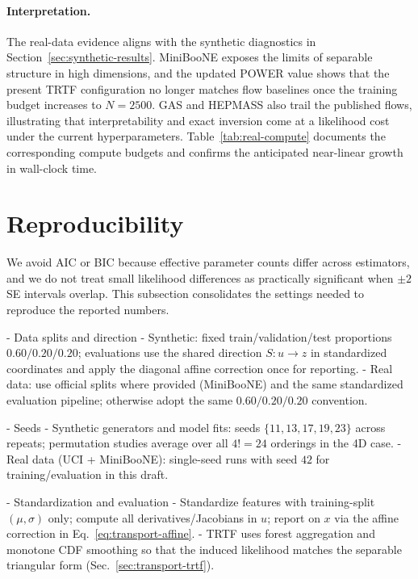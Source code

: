 \documentclass[11pt,a4paper,twoside]{book}\usepackage[]{graphicx}\usepackage[]{xcolor}
\begin{document}
\paragraph{Interpretation.} The real-data evidence aligns with the synthetic diagnostics in Section~\ref{sec:synthetic-results}. MiniBooNE exposes the limits of separable structure in high dimensions, and the updated POWER value shows that the present TRTF configuration no longer matches flow baselines once the training budget increases to $N=2500$. GAS and HEPMASS also trail the published flows, illustrating that interpretability and exact inversion come at a likelihood cost under the current hyperparameters. Table~\ref{tab:real-compute} documents the corresponding compute budgets and confirms the anticipated near-linear growth in wall-clock time.

\section{Reproducibility}\label{sec:reproducibility}
We avoid AIC or BIC because effective parameter counts differ across estimators, and we do not treat small likelihood differences as practically significant when $\pm 2$ SE intervals overlap. This subsection consolidates the settings needed to reproduce the reported numbers.

- Data splits and direction
  - Synthetic: fixed train/validation/test proportions $0.60/0.20/0.20$; evaluations use the shared direction $S:u\to z$ in standardized coordinates and apply the diagonal affine correction once for reporting.
  - Real data: use official splits where provided (MiniBooNE) and the same standardized evaluation pipeline; otherwise adopt the same $0.60/0.20/0.20$ convention.

- Seeds
  - Synthetic generators and model fits: seeds $\{11,13,17,19,23\}$ across repeats; permutation studies average over all $4!=24$ orderings in the 4D case.
  - Real data (UCI + MiniBooNE): single-seed runs with seed $42$ for training/evaluation in this draft.

- Standardization and evaluation
  - Standardize features with training-split $(\mu,\sigma)$ only; compute all derivatives/Jacobians in $u$; report on $x$ via the affine correction in Eq.~\eqref{eq:transport-affine}.
  - TRTF uses forest aggregation and monotone CDF smoothing so that the induced likelihood matches the separable triangular form (Sec.~\ref{sec:transport-trtf}).
\end{document}
